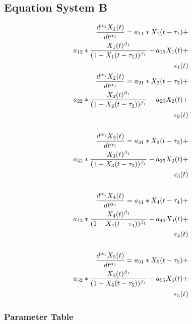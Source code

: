 \subsection{Equation System B}

\begin{align*} 
\tiny
\frac{d^{\alpha_1}X_1(t)}{dt^{\alpha_1}} = a_{11} *X_1(t - \tau_1) + \\
a_{12} *\frac{X_1(t)^{\beta_1}}{(1-X_1(t - \tau_1))^{\beta_1}} - a_{15}X_1(t) + \\
\epsilon_1(t) \\
\frac{d^{\alpha_1}X_2(t)}{dt^{\alpha_1}} = a_{21} *X_2(t - \tau_2) + \\
a_{22} *\frac{X_2(t)^{\beta_1}}{(1-X_2(t - \tau_2))^{\beta_1}} - a_{25}X_2(t) + \\
\epsilon_2(t) \\ \\
\frac{d^{\alpha_1}X_3(t)}{dt^{\alpha_1}} = a_{31} *X_3(t - \tau_3) + \\
a_{32} *\frac{X_3(t)^{\beta_1}}{(1-X_3(t - \tau_3))^{\beta_1}} - a_{35}X_3(t) + \\
\epsilon_3(t) \\ \\
\frac{d^{\alpha_1}X_4(t)}{dt^{\alpha_1}} = a_{41} *X_4(t - \tau_4) + \\
a_{42} *\frac{X_4(t)^{\beta_1}}{(1-X_4(t - \tau_4))^{\beta_1}} - a_{45}X_4(t) + \\
\epsilon_4(t) \\ \\
\frac{d^{\alpha_1}X_5(t)}{dt^{\alpha_1}} = a_{51} *X_5(t - \tau_5) + \\
a_{52} *\frac{X_5(t)^{\beta_1}}{(1-X_5(t - \tau_5))^{\beta_1}} - a_{55}X_5(t) + \\
\epsilon_5(t) \\
\end{align*}

\subsubsection{Parameter Table}

